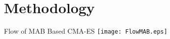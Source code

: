 \section{Methodology}

\begin{frame}{Flow of MAB Based CMA-ES}
  \texttt{[image: FlowMAB.eps]}
\end{frame}
%        
%        
%        
%        
%

